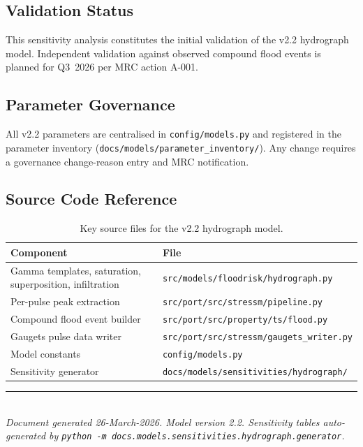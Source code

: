 \documentclass[11pt,a4paper]{article}
\begin{document}
\subsection{Validation Status}
This sensitivity analysis constitutes the initial validation of the v2.2
hydrograph model.  Independent validation against observed compound flood events
is planned for Q3~2026 per MRC action A-001.

\subsection{Parameter Governance}
All v2.2 parameters are centralised in \texttt{config/models.py} and registered
in the parameter inventory (\texttt{docs/models/parameter\_inventory/}).  Any
change requires a governance change-reason entry and MRC notification.

\begin{appendices}
\section{Source Code Reference}
\begin{table}[H]
    \centering
    \caption{Key source files for the v2.2 hydrograph model.}
    \begin{tabular}{ll}
        \toprule
        \textbf{Component} & \textbf{File} \\
        \midrule
        Gamma templates, saturation, superposition, infiltration &
            \texttt{src/models/floodrisk/hydrograph.py} \\
        Per-pulse peak extraction &
            \texttt{src/port/src/stressm/pipeline.py} \\
        Compound flood event builder &
            \texttt{src/port/src/property/ts/flood.py} \\
        Gaugets pulse data writer &
            \texttt{src/port/src/stressm/gaugets\_writer.py} \\
        Model constants &
            \texttt{config/models.py} \\
        Sensitivity generator &
            \texttt{docs/models/sensitivities/hydrograph/} \\
        \bottomrule
    \end{tabular}
\end{table}
\end{appendices}

\vfill
\noindent\rule{\textwidth}{0.4pt}\\[2pt]
{\small\textit{Document generated 26-March-2026.  Model version 2.2.
Sensitivity tables auto-generated by
\texttt{python -m docs.models.sensitivities.hydrograph.generator}.}}
\end{document}
